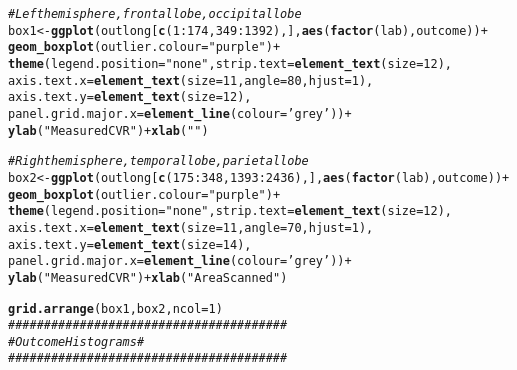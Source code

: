 \documentclass[10pt]{article}\usepackage[]{graphicx}\usepackage[]{color}
\makeatletter
\newcommand{\hlnum}[1]{\textcolor[rgb]{0.686,0.059,0.569}{#1}}%
\newcommand{\hlstr}[1]{\textcolor[rgb]{0.192,0.494,0.8}{#1}}%
\newcommand{\hlcom}[1]{\textcolor[rgb]{0.678,0.584,0.686}{\textit{#1}}}%
\newcommand{\hlopt}[1]{\textcolor[rgb]{0,0,0}{#1}}%
\newcommand{\hlstd}[1]{\textcolor[rgb]{0.345,0.345,0.345}{#1}}%
\newcommand{\hlkwb}[1]{\textcolor[rgb]{0.69,0.353,0.396}{#1}}%
\newcommand{\hlkwc}[1]{\textcolor[rgb]{0.333,0.667,0.333}{#1}}%
\newcommand{\hlkwd}[1]{\textcolor[rgb]{0.737,0.353,0.396}{\textbf{#1}}}%
\newenvironment{kframe}{%
 \def\at@end@of@kframe{}%
 \ifinner\ifhmode%
  \def\at@end@of@kframe{\end{minipage}}%
  \begin{minipage}{\columnwidth}%
 \fi\fi%
 \def\FrameCommand##1{\hskip\@totalleftmargin \hskip-\fboxsep
 \colorbox{shadecolor}{##1}\hskip-\fboxsep
     \hskip-\linewidth \hskip-\@totalleftmargin \hskip\columnwidth}%
 \MakeFramed {\advance\hsize-\width
   \@totalleftmargin\z@ \linewidth\hsize
   \@setminipage}}%
 {\par\unskip\endMakeFramed%
 \at@end@of@kframe}
\newenvironment{knitrout}{}{} %
\makeatother
\begin{document}
\begin{knitrout}
\begin{kframe}
\begin{alltt}
\hlcom{#Left hemisphere, frontal lobe, occipital lobe}
\hlstd{box1} \hlkwb{<-} \hlkwd{ggplot}\hlstd{(outlong[}\hlkwd{c}\hlstd{(}\hlnum{1}\hlopt{:}\hlnum{174}\hlstd{,}\hlnum{349}\hlopt{:}\hlnum{1392}\hlstd{),],} \hlkwd{aes}\hlstd{(}\hlkwd{factor}\hlstd{(lab), outcome))} \hlopt{+}
  \hlkwd{geom_boxplot}\hlstd{(}\hlkwc{outlier.colour} \hlstd{=} \hlstr{"purple"}\hlstd{)} \hlopt{+}
  \hlkwd{theme}\hlstd{(}\hlkwc{legend.position}\hlstd{=}\hlstr{"none"}\hlstd{,} \hlkwc{strip.text} \hlstd{=} \hlkwd{element_text}\hlstd{(}\hlkwc{size}\hlstd{=}\hlnum{12}\hlstd{),}
        \hlkwc{axis.text.x} \hlstd{=} \hlkwd{element_text}\hlstd{(}\hlkwc{size}\hlstd{=}\hlnum{11}\hlstd{,} \hlkwc{angle} \hlstd{=} \hlnum{80}\hlstd{,} \hlkwc{hjust} \hlstd{=} \hlnum{1}\hlstd{),}
        \hlkwc{axis.text.y}  \hlstd{=} \hlkwd{element_text}\hlstd{(}\hlkwc{size}\hlstd{=}\hlnum{12}\hlstd{),}
        \hlkwc{panel.grid.major.x}\hlstd{=}\hlkwd{element_line}\hlstd{(}\hlkwc{colour}\hlstd{=}\hlstr{'grey'}\hlstd{))} \hlopt{+}
  \hlkwd{ylab}\hlstd{(}\hlstr{"Measured CVR"}\hlstd{)} \hlopt{+} \hlkwd{xlab}\hlstd{(}\hlstr{""}\hlstd{)}

\hlcom{#Right hemisphere, temporal lobe, parietal lobe}
\hlstd{box2} \hlkwb{<-} \hlkwd{ggplot}\hlstd{(outlong[}\hlkwd{c}\hlstd{(}\hlnum{175}\hlopt{:}\hlnum{348}\hlstd{,}\hlnum{1393}\hlopt{:}\hlnum{2436}\hlstd{),],} \hlkwd{aes}\hlstd{(}\hlkwd{factor}\hlstd{(lab), outcome))} \hlopt{+}
  \hlkwd{geom_boxplot}\hlstd{(}\hlkwc{outlier.colour} \hlstd{=} \hlstr{"purple"}\hlstd{)} \hlopt{+}
  \hlkwd{theme}\hlstd{(}\hlkwc{legend.position}\hlstd{=}\hlstr{"none"}\hlstd{,} \hlkwc{strip.text} \hlstd{=} \hlkwd{element_text}\hlstd{(}\hlkwc{size}\hlstd{=}\hlnum{12}\hlstd{),}
        \hlkwc{axis.text.x} \hlstd{=} \hlkwd{element_text}\hlstd{(}\hlkwc{size}\hlstd{=}\hlnum{11}\hlstd{,} \hlkwc{angle} \hlstd{=} \hlnum{70}\hlstd{,} \hlkwc{hjust} \hlstd{=} \hlnum{1}\hlstd{),}
        \hlkwc{axis.text.y}  \hlstd{=} \hlkwd{element_text}\hlstd{(}\hlkwc{size}\hlstd{=}\hlnum{14}\hlstd{),}
        \hlkwc{panel.grid.major.x}\hlstd{=}\hlkwd{element_line}\hlstd{(}\hlkwc{colour}\hlstd{=}\hlstr{'grey'}\hlstd{))} \hlopt{+}
  \hlkwd{ylab}\hlstd{(}\hlstr{"Measured CVR"}\hlstd{)} \hlopt{+} \hlkwd{xlab}\hlstd{(}\hlstr{"Area Scanned"}\hlstd{)}

\hlkwd{grid.arrange}\hlstd{(box1, box2,} \hlkwc{ncol} \hlstd{=} \hlnum{1}\hlstd{)}
\hlcom{#######################################}
\hlcom{#  Outcome Histograms                 #}
\hlcom{#######################################}


\end{alltt}
\end{kframe}
\end{knitrout}
\end{document}
